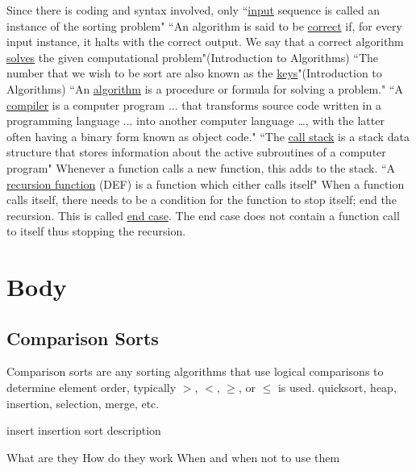 \documentclass[12pt]{article}
\begin{document}
	Since there is coding and syntax involved, only 
	``\underline{input} sequence is called an instance of the sorting problem"\cite[p.~5]{intro}\newline
	``An algorithm is said to be \underline{correct} if, for every input instance, it halts with the correct output. We say that a correct algorithm \underline{solves} the given computational problem"(Introduction to Algorithms)\cite[p.~6]{intro}\newline
	``The number that we wish to be sort are also known as the \underline{keys}"(Introduction to Algorithms)\cite[p.~16]{intro}\newline
	``An \underline{algorithm} is a procedure or formula for solving a problem."\cite{wiki}\newline
	``A \underline{compiler} is a computer program ... that transforms source code written in a programming language ... into another computer language …, with the latter often having a binary form known as object code."\cite{wiki}\newline
	``The \underline{call stack} is a stack data structure that stores information about the active subroutines of a computer program"\cite{wiki} Whenever a function calls a new function, this adds to the stack.\newline
	``A \underline{recursion function} (DEF) is a function which either calls itself"\cite{wiki} When a function calls itself, there needs to be a condition for the function to stop itself; end the recursion. This is called \underline{end case}. The end case does not contain a function call to itself thus stopping the recursion.\newline
	
	\section{Body}
	
	\subsection{Comparison Sorts}
	\label{CompSort}
	Comparison sorts are any sorting algorithms that use logical comparisons to determine element order, typically $>$, $<$, $\ge$, or $\le$ is used.
	quicksort, heap, insertion, selection, merge, etc.
	
	insert insertion sort description
	
	What are they
	How do they work
	When and when not to use them
	
	
\end{document}
